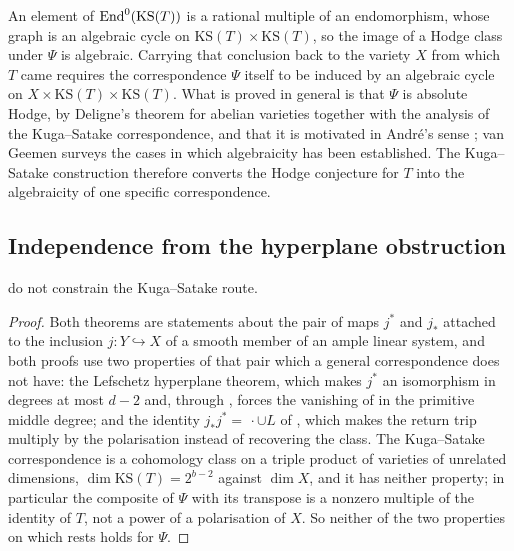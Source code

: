 \begin{remark}%
\label{rem:kstransport}
An element of $\operatorname{End}^{0}(\mathrm{KS}(T))$ is a rational multiple of an
endomorphism, whose graph is an algebraic cycle on
$\mathrm{KS}(T)\times\mathrm{KS}(T)$, so the image of a Hodge class under
$\Psi$ is algebraic. Carrying that conclusion back to the variety $X$ from
which $T$ came requires the correspondence $\Psi$ itself to be induced by an
algebraic cycle on $X\times\mathrm{KS}(T)\times\mathrm{KS}(T)$. What is
proved in general is that $\Psi$ is absolute Hodge, by
Deligne's theorem for abelian varieties together with the analysis of the
Kuga--Satake correspondence, and that it is motivated in Andr\'e's sense
\cite{And96}; van Geemen \cite{vG00} surveys the cases in which algebraicity
has been established. The Kuga--Satake construction therefore converts the
Hodge conjecture for $T$ into the algebraicity of one specific
correspondence.
\end{remark}

\subsection{Independence from the hyperplane obstruction}

\begin{proposition}\label{prop:ksnotrestriction}
 do not constrain the Kuga--Satake route.
\end{proposition}

\begin{proof}
Both theorems are statements about the pair of maps $j^{*}$ and $j_{*}$
attached to the inclusion $j\colon Y\hookrightarrow X$ of a smooth member of an
ample linear system, and both proofs use two properties of that pair which a
general correspondence does not have: the Lefschetz hyperplane theorem, which
makes $j^{*}$ an isomorphism in degrees at most $d-2$ and, through
, forces the vanishing of  in
the primitive middle degree; and the identity $j_{*}j^{*}=\,\cdot\cup L$ of
, which makes the return trip multiply by the
polarisation instead of recovering the class. The Kuga--Satake
correspondence is a cohomology class on a triple product of varieties of
unrelated dimensions, $\dim\mathrm{KS}(T)=2^{b-2}$ against $\dim X$, and it has
neither property; in particular the composite of $\Psi$ with its transpose is
a nonzero multiple of the identity of $T$, not a power of a polarisation of
$X$. So
neither of the two properties on which  rests holds for
$\Psi$.
\end{proof}

